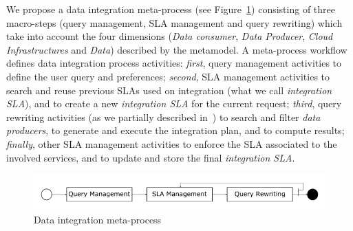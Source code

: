 We propose a data integration meta-process (see Figure~\ref{fig:metaprocess}) consisting of three macro-steps (query management, SLA management and query rewriting) which take into account  the four  dimensions (\textsl{Data consumer}, \textsl{Data Producer}, \textsl{Cloud Infrastructures} and \textsl{Data}) described by the metamodel.
A meta-process workflow defines data integration process activities: \textit{first}, query management activities  to define the user query and preferences; \textit{second}, SLA management activities  to search and reuse previous SLAs used on integration (what we call \textsl{integration SLA}), and to create a new \textsl{integration SLA} for the current request; \textit{third}, query rewriting activities (as we partially described in~\cite{carvalho2016}) to search and filter \textsl{data producers}, to generate and execute the integration plan, and to compute results; \textit{finally}, other SLA management activities  to enforce the SLA associated to the involved services, and to update and store the final \textsl{integration SLA}. 

\begin{figure}[h!]
\center
\includegraphics[scale=0.40]{meta-process.png}
\caption{Data integration meta-process}\label{fig:metaprocess}
\end{figure}

